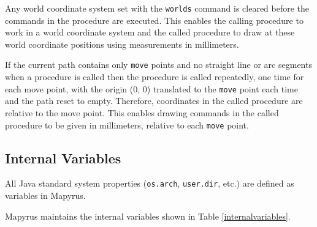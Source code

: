 Any world coordinate system set with the \texttt{worlds} command is cleared
before the commands in the procedure are executed.  This enables the calling
procedure to work in a world coordinate system and the called procedure to draw
at these world coordinate positions using measurements in millimeters.

If the current path contains only \texttt{move} points and no straight line or
arc segments when a procedure is called then the procedure is called
repeatedly, one time for each move point, with the origin (0, 0) translated to
the \texttt{move} point each time and the path reset to empty.  Therefore,
coordinates in the called procedure are relative to the move point.  This
enables drawing commands in the called procedure to be given in millimeters,
relative to each \texttt{move} point.

\subsection{Internal Variables}

All Java standard system properties (\texttt{os.arch}, \texttt{user.dir}, etc.)
are defined as variables in Mapyrus.

Mapyrus maintains the internal variables shown in Table \ref{internalvariables}.

